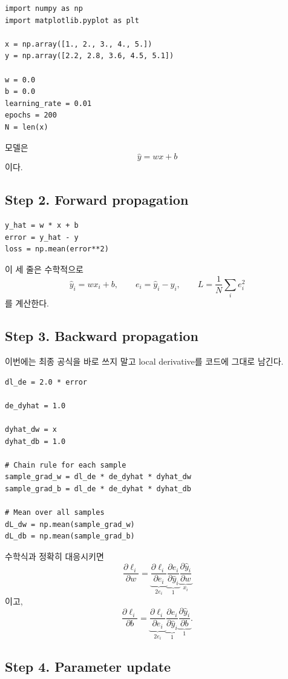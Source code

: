 \documentclass[11pt,a4paper]{article}
\begin{document}
\begin{lstlisting}
import numpy as np
import matplotlib.pyplot as plt

x = np.array([1., 2., 3., 4., 5.])
y = np.array([2.2, 2.8, 3.6, 4.5, 5.1])

w = 0.0
b = 0.0
learning_rate = 0.01
epochs = 200
N = len(x)
\end{lstlisting}

모델은
\[
\widehat y=wx+b
\]
이다.

\subsection{Step 2. Forward propagation}

\begin{lstlisting}
y_hat = w * x + b
error = y_hat - y
loss = np.mean(error**2)
\end{lstlisting}

이 세 줄은 수학적으로
\[
\widehat y_i=wx_i+b,
\qquad
e_i=\widehat y_i-y_i,
\qquad
L=\frac1N\sum_i e_i^2
\]
를 계산한다.

\subsection{Step 3. Backward propagation}

이번에는 최종 공식을 바로 쓰지 말고 local derivative를 코드에 그대로 남긴다.

\begin{lstlisting}
dl_de = 2.0 * error

de_dyhat = 1.0

dyhat_dw = x
dyhat_db = 1.0

# Chain rule for each sample
sample_grad_w = dl_de * de_dyhat * dyhat_dw
sample_grad_b = dl_de * de_dyhat * dyhat_db

# Mean over all samples
dL_dw = np.mean(sample_grad_w)
dL_db = np.mean(sample_grad_b)
\end{lstlisting}

수학식과 정확히 대응시키면
\[
\frac{\partial \ell_i}{\partial w}
=
\underbrace{\frac{\partial \ell_i}{\partial e_i}}_{2e_i}
\underbrace{\frac{\partial e_i}{\partial \widehat y_i}}_{1}
\underbrace{\frac{\partial \widehat y_i}{\partial w}}_{x_i}
\]
이고,
\[
\frac{\partial \ell_i}{\partial b}
=
\underbrace{\frac{\partial \ell_i}{\partial e_i}}_{2e_i}
\underbrace{\frac{\partial e_i}{\partial \widehat y_i}}_{1}
\underbrace{\frac{\partial \widehat y_i}{\partial b}}_{1}.
\]

\subsection{Step 4. Parameter update}
\end{document}

